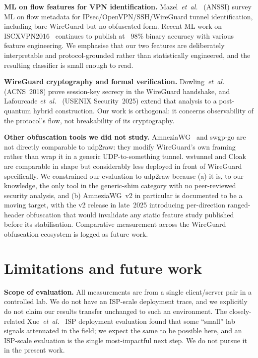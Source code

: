 \documentclass[conference]{IEEEtran}
\begin{document}
\textbf{ML on flow features for VPN identification.}
Mazel~\textit{et~al.}~\cite{mazel2022ml} (ANSSI) survey ML on flow metadata
for IPsec/OpenVPN/SSH/WireGuard tunnel identification, including bare
WireGuard but no obfuscated form. Recent ML work on
ISCXVPN2016~\cite{razooqi2025wavelet} continues to publish at ~98\%
binary accuracy with various feature engineering. We emphasise that our
two features are deliberately interpretable and protocol-grounded rather
than statistically engineered, and the resulting classifier is small
enough to read.

\textbf{WireGuard cryptography and formal verification.}
Dowling~\textit{et~al.}~\cite{dowling2018crypto} (ACNS~2018) prove
session-key secrecy in the WireGuard handshake, and Lafourcade
\textit{et~al.}~\cite{lafourcade2025wireguard} (USENIX Security~2025)
extend that analysis to a post-quantum hybrid construction. Our work is
orthogonal: it concerns observability of the protocol's flow, not
breakability of its cryptography.

\textbf{Other obfuscation tools we did not study.}
AmneziaWG~\cite{amneziawg} and swgp-go are not directly comparable to
udp2raw: they modify WireGuard's own framing rather than wrap it in a
generic UDP-to-something tunnel. wstunnel and Cloak are comparable in
shape but considerably less deployed in front of WireGuard
specifically. We constrained our evaluation to udp2raw because (a) it
is, to our knowledge, the only tool in the generic-shim category with
no peer-reviewed security analysis, and (b) AmneziaWG~v2 in particular
is documented to be a moving target, with the v2 release in late~2025
introducing per-direction ranged-header obfuscation that would
invalidate any static feature study published before its
stabilisation. Comparative measurement across the WireGuard
obfuscation ecosystem is logged as future work.

\section{Limitations and future work}
\label{sec:limits}

\textbf{Scope of evaluation.} All measurements are from a single
client/server pair in a controlled lab. We do not have an ISP-scale
deployment trace, and we explicitly do not claim our results transfer
unchanged to such an environment. The closely-related
Xue~\textit{et~al.}~\cite{xue2022openvpn} ISP deployment evaluation found
that some ``small'' lab signals attenuated in the field; we expect the
same to be possible here, and an ISP-scale evaluation is the
single most-impactful next step. We do not pursue it in the present work.
\end{document}
